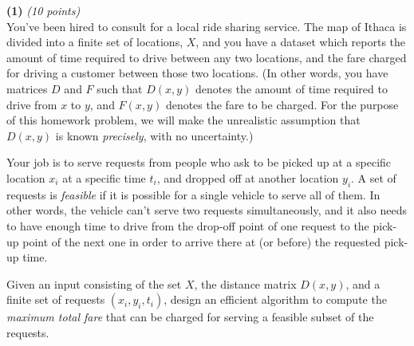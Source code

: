 \documentclass[12pt]{article}
\def\bigap{0.25in}
\begin{document}
\setlength{\parindent}{0in}
\addtolength{\parskip}{0.1cm}
\setlength{\fboxrule}{.5mm}\setlength{\fboxsep}{1.2mm}
\newlength{\boxlength}\setlength{\boxlength}{\textwidth}
\addtolength{\boxlength}{-4mm}
\begin{center}
\end{center}
\vspace{5mm}

{\bf (1)} {\em (10 points)} \\
You've been hired to consult for a local ride sharing service. The
map of Ithaca is divided into a finite set of locations,
$X$, and you have a dataset which reports the
amount of time required to drive 
between any two locations, and the fare
charged for driving a customer between those
two locations. (In other words,
you have matrices $D$ and $F$ such that $D(x,y)$ denotes
the amount of time required to drive from
$x$ to $y$, and $F(x,y)$ denotes the fare to be charged. 
For the purpose of this homework problem,
we will make the unrealistic assumption that
$D(x,y)$ is known {\em precisely}, with no uncertainty.)

Your job is to serve 
requests from people who ask to be picked up at
a specific location $x_i$ at a specific time $t_i$, 
and dropped off at another location $y_i$.  A set of 
requests is \emph{feasible} if it is possible for
a single vehicle to serve all of them.  In other
words, the vehicle can't serve two requests simultaneously, 
and it also needs to have enough time to drive from the 
drop-off point of one request to the pick-up point of 
the next one in order to arrive there at (or before) the 
requested pick-up time.

Given an input consisting of the set $X$, the 
distance matrix $D(x,y)$, and a finite set
of requests $(x_i,y_i,t_i)$, design an efficient
algorithm to compute the \emph{maximum total fare}
that can be charged for serving a feasible subset of
the requests.


\vskip \bigap

\end{document}
